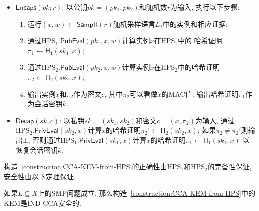 \begin{construction}
\begin{itemize}
\item $\mathsf{Encaps}(pk; r)$: 以公钥$pk = (pk_1, pk_2)$和随机数$r$为输入, 执行以下步骤:
    \begin{enumerate}
        \item 运行$(x, w) \leftarrow \mathsf{SampR}(r)$随机采样语言$L_1$中的实例和相应证据; 
        \item 通过$\text{HPS}_1.\mathsf{PubEval}(pk_1, x, w)$计算实例$x$在$\text{HPS}_1$中的
            哈希证明$\pi_1 \leftarrow \mathsf{H}_1(sk_1, x)$; 
        \item 通过$\text{HPS}_2.\mathsf{PubEval}(pk_2, x, w)$计算实例$x$在$\text{HPS}_2$中的哈希证明
            $\pi_2 \leftarrow \mathsf{H}_2(sk_2, x)$; 
        \item 输出实例$x$和$\pi_2$作为密文$c$, 其中$\pi_2$可以看做$x$的MAC值; 输出哈希证明$\pi_1$作为会话密钥$k$. 
    \end{enumerate}

    \item $\mathsf{Decap}(sk, c)$: 以私钥$sk = (sk_1, sk_2)$和密文$c = (x, \pi_2)$为输入, 
        通过$\text{HPS}_2.\mathsf{PrivEval}(sk_2, x)$计算$x$的哈希证明$\pi_2' \leftarrow \mathsf{H}_2(sk_2, x)$;
        如果$\pi_2 \neq \pi_2'$则输出$\bot$, 
        否则通过$\text{HPS}_1.\mathsf{PrivEval}(sk_1, x)$计算$x$的哈希证明$\pi_1 \leftarrow \mathsf{H}_1(sk_1, x)$
        以恢复会话密钥$k$. 
\end{itemize}
\end{construction} 

构造~\ref{construction:CCA-KEM-from-HPS}的正确性由$\text{HPS}_1$和$\text{HPS}_2$的完备性保证, 安全性由以下定理保证. 

\begin{theorem}
如果$L \subseteq X$上的SMP问题成立, 那么构造~\ref{construction:CCA-KEM-from-HPS}中的KEM是IND-CCA安全的. 
\end{theorem}

